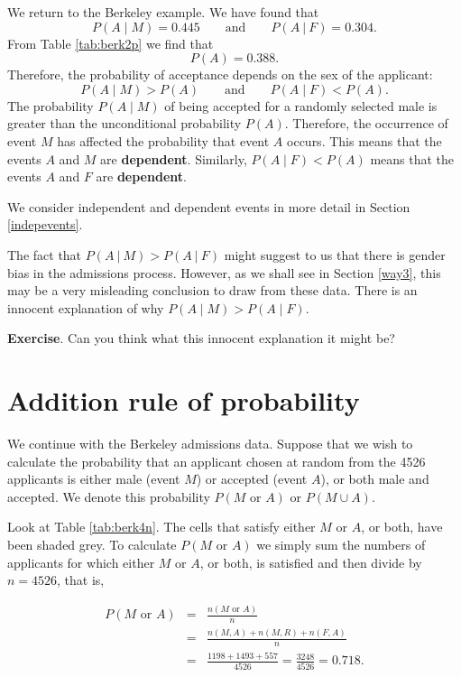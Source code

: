 \documentclass[
  british,
  11pt,
  openany, a4paper]{book}
\begin{document}
We return to the Berkeley example. We have found that
\[ P(A \mid M) = 0.445 \qquad \text{and} \qquad P(A~|~F) = 0.304. \]
From Table \ref{tab:berk2p} we find that
\[ P(A) = 0.388. \]
Therefore, the probability of acceptance depends on the sex of the applicant:
\[ P(A \mid M) > P(A) \qquad \text{and} \qquad P(A \mid F) < P(A). \]
The probability \(P(A \mid M)\) of being accepted for a randomly selected male is greater than the unconditional probability \(P(A)\). Therefore, the occurrence of event \(M\) has affected the probability that event \(A\) occurs. This means that the events \(A\) and \(M\) are \textbf{dependent}. Similarly, \(P(A \mid F) < P(A)\) means that the events \(A\) and \(F\) are \textbf{dependent}.

We consider independent and dependent events in more detail in Section \ref{indepevents}.

The fact that \(P(A~|~M) > P(A~|~F)\) might suggest to us that there is gender bias in the admissions process. However, as we shall see in Section \ref{way3}, this may be a very misleading conclusion to draw from these data. There is an innocent explanation of why \(P(A \mid M) > P(A \mid F)\).

\textbf{Exercise}. Can you think what this innocent explanation it might be?

\section{Addition rule of probability}\label{addition-rule-of-probability}

We continue with the Berkeley admissions data. Suppose that we wish to calculate the probability that an applicant chosen at random from the 4526 applicants is either male (event \(M\)) or accepted (event \(A\)), or both male and accepted. We denote this probability \(P(M \text{ or } A)\) or \(P(M \cup A)\).

Look at Table \ref{tab:berk4n}. The cells that satisfy either \(M\) or \(A\), or both, have been shaded grey. To calculate \(P(M \text{ or } A)\) we simply sum the numbers of applicants for which either \(M\) or \(A\), or both, is satisfied and then divide by \(n=4526\), that is,

\begin{eqnarray*}
P(M \text{ or } A) &=& \frac{n(M \text{ or } A)}{n} \\
          &=& \frac{n(M , A)+n(M , R)+n(F , A)}{n} \\
          &=& \frac{1198+1493+557}{4526} = \frac{3248}{4526} = 0.718. 
\end{eqnarray*}
\end{document}
